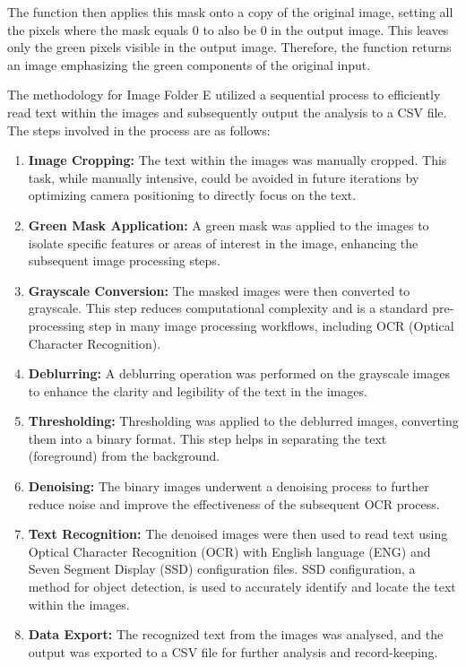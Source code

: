 The function then applies this mask onto a copy of the original image, setting all the pixels where the mask equals 0 to also be 0 in the output image. This leaves only the green pixels visible in the output image. Therefore, the function returns an image emphasizing the green components of the original input.

The methodology for Image Folder E utilized a sequential process to efficiently read text within the images and subsequently output the analysis to a CSV file. The steps involved in the process are as follows:

\begin{enumerate}
    \item \textbf{Image Cropping:} The text within the images was manually cropped. This task, while manually intensive, could be avoided in future iterations by optimizing camera positioning to directly focus on the text.

    \item \textbf{Green Mask Application:} A green mask was applied to the images to isolate specific features or areas of interest in the image, enhancing the subsequent image processing steps.

    \item \textbf{Grayscale Conversion:} The masked images were then converted to grayscale. This step reduces computational complexity and is a standard pre-processing step in many image processing workflows, including OCR (Optical Character Recognition).

    \item \textbf{Deblurring:} A deblurring operation was performed on the grayscale images to enhance the clarity and legibility of the text in the images.

    \item \textbf{Thresholding:} Thresholding was applied to the deblurred images, converting them into a binary format. This step helps in separating the text (foreground) from the background.

    \item \textbf{Denoising:} The binary images underwent a denoising process to further reduce noise and improve the effectiveness of the subsequent OCR process.

    \item \textbf{Text Recognition:} The denoised images were then used to read text using Optical Character Recognition (OCR) with English language (ENG) and Seven Segment Display (SSD) configuration files. SSD configuration, a method for object detection, is used to accurately identify and locate the text within the images.

    \item \textbf{Data Export:} The recognized text from the images was analysed, and the output was exported to a CSV file for further analysis and record-keeping.
\end{enumerate}

